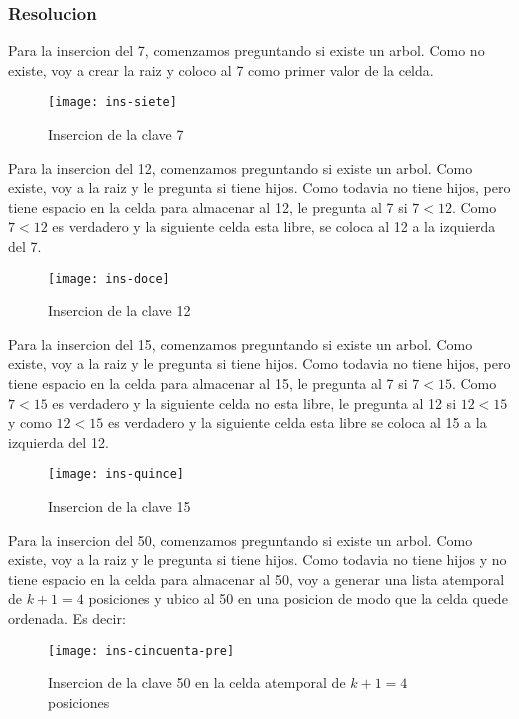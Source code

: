 \documentclass[10pt,a4paper]{article}
\begin{document}
\subsubsection{Resolucion}

Para la insercion del 7, comenzamos preguntando si existe un arbol. Como no existe, voy a crear la raiz y coloco al 7 como primer valor de la celda.

\begin{figure}[h]
\centering
\texttt{[image: ins-siete]}
\caption{Insercion de la clave 7}
\label{drivers1}
\end{figure}

Para la insercion del 12, comenzamos preguntando si existe un arbol. Como existe, voy a la raiz y le pregunta si tiene hijos. Como todavia no tiene hijos, pero tiene espacio en la celda para almacenar al 12, le pregunta al 7 si $7 < 12$.
\newline
Como $7 < 12$ es verdadero y la siguiente celda esta libre, se coloca al 12 a la izquierda del 7.

\begin{figure}[h]
\centering
\texttt{[image: ins-doce]}
\caption{Insercion de la clave 12}
\label{drivers1}
\end{figure}
\newpage

Para la insercion del 15, comenzamos preguntando si existe un arbol. Como existe, voy a la raiz y le pregunta si tiene hijos. Como todavia no tiene hijos, pero tiene espacio en la celda para almacenar al 15, le pregunta al 7 si $7 < 15$.
\newline
Como $7 < 15$ es verdadero y la siguiente celda no esta libre, le pregunta al 12 si $12 < 15$ y como $12 < 15$ es verdadero y la siguiente celda esta libre se coloca al 15 a la izquierda del 12.

\begin{figure}[h]
\centering
\texttt{[image: ins-quince]}
\caption{Insercion de la clave 15}
\label{drivers1}
\end{figure}

Para la insercion del 50, comenzamos preguntando si existe un arbol. Como existe, voy a la raiz y le pregunta si tiene hijos. Como todavia no tiene hijos y no tiene espacio en la celda para almacenar al 50, voy a generar una lista atemporal de $k+1 = 4$ posiciones y ubico al 50 en una posicion de modo que la celda quede ordenada. Es decir:

\begin{figure}[h]
\centering
\texttt{[image: ins-cincuenta-pre]}
\caption{Insercion de la clave 50 en la celda atemporal de $k+1 = 4$ posiciones}
\label{drivers1}
\end{figure}
\end{document}
